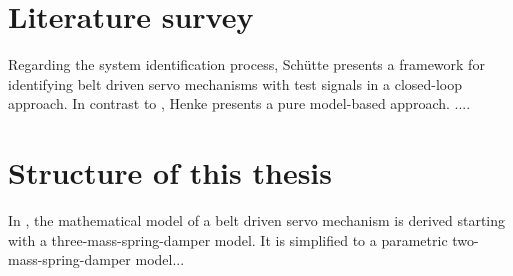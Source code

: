 \section{Literature survey}
Regarding the system identification process, Sch\"utte \cite{Schuette02} presents a framework for identifying belt driven servo mechanisms with test signals in a closed-loop approach. In contrast to \cite{Schuette02}, Henke \cite{Henke16} presents a pure model-based approach. .... 

\section{Structure of this thesis}
In , the mathematical model of a belt driven servo mechanism is derived starting with a three-mass-spring-damper model. It is simplified to a parametric two-mass-spring-damper model...